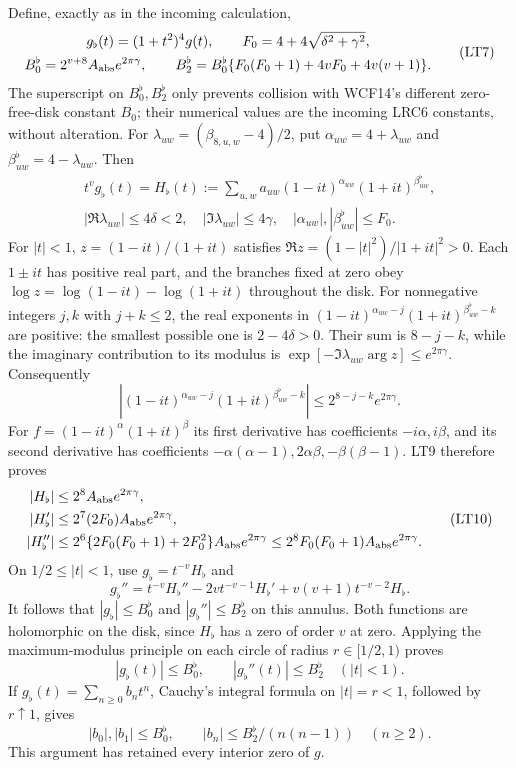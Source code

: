 \documentclass[11pt,a4paper]{article}
\begin{document}
Define, exactly as in the incoming calculation,
\[
\begin{gathered}
 g_\flat(t)=(1+t^2)^4g(t),\qquad
 F_0=4+4\sqrt{\delta^2+\gamma^2},\\
 B_0^{\flat}=2^{v+8}A_{\rm abs}e^{2\pi\gamma},\qquad
 B_2^{\flat}=B_0^{\flat}
 \{F_0(F_0+1)+4vF_0+4v(v+1)\}.
\end{gathered}                                                   \tag{LT7}
\]
The superscript on $B_0^{\flat},B_2^{\flat}$ only prevents collision
with WCF14's different zero-free-disk constant $B_0$; their numerical
values are the incoming LRC6 constants, without alteration.
For $\lambda_{uw}=(\beta_{8,u,w}-4)/2$, put
$\alpha_{uw}=4+\lambda_{uw}$ and $\beta^{\flat}_{uw}=4-\lambda_{uw}$.
Then
\[
\begin{gathered}
 t^vg_\flat(t)=H_\flat(t):=
 \sum_{u,w}a_{uw}(1-it)^{\alpha_{uw}}(1+it)^{\beta^{\flat}_{uw}},
 \\ |\Re\lambda_{uw}|\le4\delta<2,
 \quad |\Im\lambda_{uw}|\le4\gamma,
 \quad |\alpha_{uw}|,|\beta^{\flat}_{uw}|\le F_0.
\end{gathered}            \tag{LT8}
\]
For $|t|<1$, $z=(1-it)/(1+it)$ satisfies
$\Re z=(1-|t|^2)/|1+it|^2>0$. Each $1\pm it$ has positive
real part, and the branches fixed at zero obey
$\log z=\log(1-it)-\log(1+it)$ throughout the disk.
For nonnegative integers $j,k$ with $j+k\le2$, the real exponents
in $(1-it)^{\alpha_{uw}-j}(1+it)^{\beta^{\flat}_{uw}-k}$ are
positive: the smallest possible one is $2-4\delta>0$.
Their sum is $8-j-k$, while the imaginary contribution to its
modulus is $\exp[-\Im\lambda_{uw}\arg z]\le e^{2\pi\gamma}$.
Consequently
\[
 |(1-it)^{\alpha_{uw}-j}(1+it)^{\beta^{\flat}_{uw}-k}|
 \le 2^{8-j-k}e^{2\pi\gamma}.                              \tag{LT9}
\]
For $f=(1-it)^\alpha(1+it)^\beta$ its first derivative has
coefficients $-i\alpha,i\beta$, and its second derivative has
coefficients $-\alpha(\alpha-1),2\alpha\beta,-\beta(\beta-1)$.
LT9 therefore proves
\[
\begin{split}
 |H_\flat|&\le2^8A_{\rm abs}e^{2\pi\gamma},\\
 |H_\flat'|&\le2^7(2F_0)A_{\rm abs}e^{2\pi\gamma},\\
 |H_\flat''|&\le2^6\{2F_0(F_0+1)+2F_0^2\}
                      A_{\rm abs}e^{2\pi\gamma}
 \le2^8F_0(F_0+1)A_{\rm abs}e^{2\pi\gamma}.
\end{split}                                                     \tag{LT10}
\]
On $1/2\le|t|<1$, use $g_\flat=t^{-v}H_\flat$ and
\[
 g_\flat''=t^{-v}H_\flat''-2vt^{-v-1}H_\flat'
                         +v(v+1)t^{-v-2}H_\flat .
\]
It follows that $|g_\flat|\le B_0^{\flat}$ and
$|g_\flat''|\le B_2^{\flat}$ on this annulus. Both functions
are holomorphic on the disk, since $H_\flat$ has a zero of order
$v$ at zero. Applying the maximum-modulus principle on each circle
of radius $r\in[1/2,1)$ proves
\[
 \boxed{|g_\flat(t)|\le B_0^{\flat},\qquad
 |g_\flat''(t)|\le B_2^{\flat}\quad(|t|<1).}              \tag{LRC6}
\]
If $g_\flat(t)=\sum_{n\ge0}b_nt^n$, Cauchy's integral formula
on $|t|=r<1$, followed by $r\uparrow1$, gives
\[
 |b_0|,|b_1|\le B_0^{\flat},\qquad
 |b_n|\le B_2^{\flat}/(n(n-1))\quad(n\ge2).               \tag{LT11}
\]
This argument has retained every interior zero of $g$.
\end{document}

